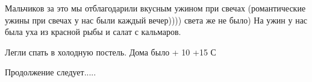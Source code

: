 Мальчиков за это мы отблагодарили вкусным ужином при свечах (романтические
ужины при свечах у нас были каждый вечер)))) света же не было) На ужин у нас
была уха из красной рыбы и салат с кальмаров. 

Легли спать в холодную постель. Дома было + 10 +15 С

Продолжение следует.....

